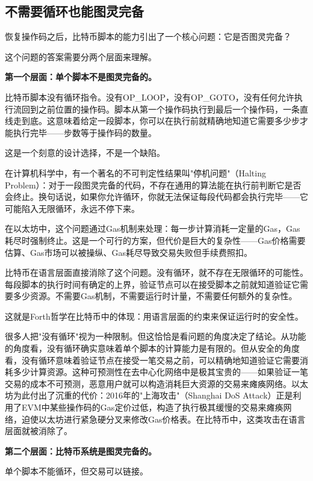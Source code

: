 \documentclass[a4paper,12pt,openany]{ctexbook}
\begin{document}
\subsection*{不需要循环也能图灵完备}


恢复操作码之后，比特币脚本的能力引出了一个核心问题：它是否图灵完备？

这个问题的答案需要分两个层面来理解。

\textbf{第一个层面：单个脚本不是图灵完备的。}

比特币脚本没有循环指令。没有OP\_LOOP，没有OP\_GOTO，没有任何允许执行流回到之前位置的操作码。脚本从第一个操作码执行到最后一个操作码，一条直线走到底。这意味着给定一段脚本，你可以在执行前就精确地知道它需要多少步才能执行完毕——步数等于操作码的数量。

这是一个刻意的设计选择，不是一个缺陷。

在计算机科学中，有一个著名的不可判定性结果叫"停机问题"（Halting Problem）：对于一段图灵完备的代码，不存在通用的算法能在执行前判断它是否会终止。换句话说，如果你允许循环，你就无法保证每段代码都会执行完毕——它可能陷入无限循环，永远不停下来。

在以太坊中，这个问题通过Gas机制来处理：每一步计算消耗一定量的Gas，Gas耗尽时强制终止。这是一个可行的方案，但代价是巨大的复杂性——Gas价格需要估算、Gas市场可以被操纵、Gas耗尽导致交易失败但手续费照扣。

比特币在语言层面直接消除了这个问题。没有循环，就不存在无限循环的可能性。每段脚本的执行时间有确定的上界，验证节点可以在接受脚本之前就知道验证它需要多少资源。不需要Gas机制，不需要运行时计量，不需要任何额外的复杂性。

这就是Forth哲学在比特币中的体现：用语言层面的约束来保证运行时的安全性。

很多人把"没有循环"视为一种限制。但这恰恰是看问题的角度决定了结论。从功能的角度看，没有循环确实意味着单个脚本的计算能力是有限的。但从安全的角度看，没有循环意味着验证节点在接受一笔交易之前，可以精确地知道验证它需要消耗多少计算资源。这种可预测性在去中心化网络中是极其宝贵的——如果验证一笔交易的成本不可预测，恶意用户就可以构造消耗巨大资源的交易来瘫痪网络。以太坊为此付出了沉重的代价：2016年的"上海攻击"（Shanghai DoS Attack）正是利用了EVM中某些操作码的Gas定价过低，构造了执行极其缓慢的交易来瘫痪网络，迫使以太坊进行紧急硬分叉来修改Gas价格表。在比特币中，这类攻击在语言层面就被消除了。

\textbf{第二个层面：比特币系统是图灵完备的。}

单个脚本不能循环，但交易可以链接。
\end{document}

